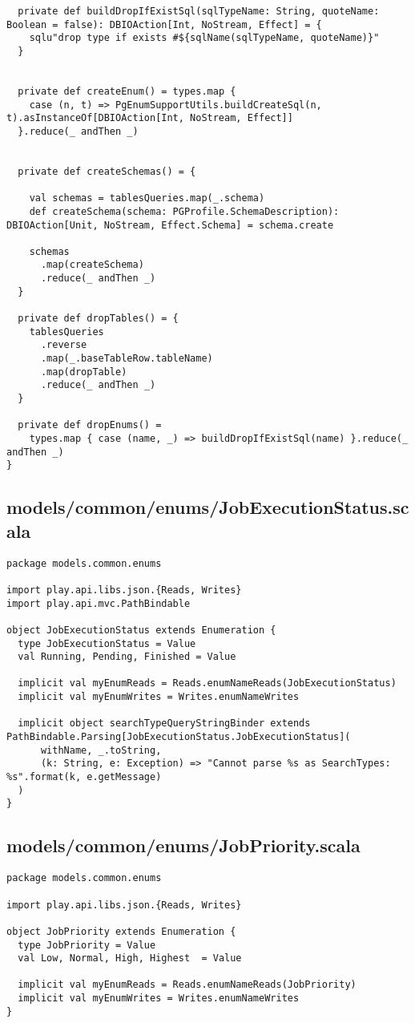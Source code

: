 \begin{lstlisting}
  private def buildDropIfExistSql(sqlTypeName: String, quoteName: Boolean = false): DBIOAction[Int, NoStream, Effect] = {
    sqlu"drop type if exists #${sqlName(sqlTypeName, quoteName)}"
  }


  private def createEnum() = types.map {
    case (n, t) => PgEnumSupportUtils.buildCreateSql(n, t).asInstanceOf[DBIOAction[Int, NoStream, Effect]]
  }.reduce(_ andThen _)


  private def createSchemas() = {

    val schemas = tablesQueries.map(_.schema)
    def createSchema(schema: PGProfile.SchemaDescription): DBIOAction[Unit, NoStream, Effect.Schema] = schema.create

    schemas
      .map(createSchema)
      .reduce(_ andThen _)
  }

  private def dropTables() = {
    tablesQueries
      .reverse
      .map(_.baseTableRow.tableName)
      .map(dropTable)
      .reduce(_ andThen _)
  }

  private def dropEnums() =
    types.map { case (name, _) => buildDropIfExistSql(name) }.reduce(_ andThen _)
}
\end{lstlisting}
\subsection{models/common/enums/JobExecutionStatus.scala}
\begin{lstlisting}
package models.common.enums

import play.api.libs.json.{Reads, Writes}
import play.api.mvc.PathBindable

object JobExecutionStatus extends Enumeration {
  type JobExecutionStatus = Value
  val Running, Pending, Finished = Value

  implicit val myEnumReads = Reads.enumNameReads(JobExecutionStatus)
  implicit val myEnumWrites = Writes.enumNameWrites

  implicit object searchTypeQueryStringBinder extends PathBindable.Parsing[JobExecutionStatus.JobExecutionStatus](
      withName, _.toString,
      (k: String, e: Exception) => "Cannot parse %s as SearchTypes: %s".format(k, e.getMessage)
  )
}
\end{lstlisting}
\subsection{models/common/enums/JobPriority.scala}
\begin{lstlisting}
package models.common.enums

import play.api.libs.json.{Reads, Writes}

object JobPriority extends Enumeration {
  type JobPriority = Value
  val Low, Normal, High, Highest  = Value

  implicit val myEnumReads = Reads.enumNameReads(JobPriority)
  implicit val myEnumWrites = Writes.enumNameWrites
}
\end{lstlisting}
